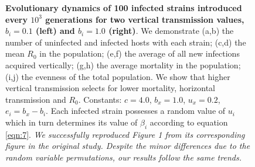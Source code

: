 \begin{figure}[tbph]
    \medskip
    \hfil

    \medskip
    \hfil
\caption{\textbf{Evolutionary dynamics of 100 infected strains introduced every
$10^3$ generations for two vertical transmission values, $b_i = 0.1$ (left) and
$b_i = 1.0$ (right)}. We demonstrate (a,b) the number of uninfected and infected
hosts with each strain; (c,d) the mean $R_0$ in the population; (e,f) the
average of all new infections acquired vertically; (g,h) the average mortality
in the population; (i,j) the evenness of the total population. We show that
higher vertical transmission selects for lower mortality, horizontal
transmission and $R_0$. Constants: $c = 4.0$, $b_x = 1.0$,
$u_x = 0.2$, $e_i = b_x - b_i$. Each infected strain possesses a random value
of $u_i$ \in [$u_x$, 1] which in turn determines its value of $\beta_i$
according to equation \ref{eqn:7}. \textit{We successfully reproduced Figure 1
from its corresponding figure in the original study. Despite the minor
differences due to the random variable permutations, our results follow the
same trends.}
}
\label{fig:figure1}
\end{figure}

